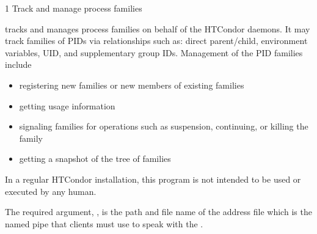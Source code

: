 \begin{ManPage}{\label{man-condor-procd}}{1}
{Track and manage process families}
\Synopsis {}



\Description 

 tracks and manages process families on behalf of the
HTCondor daemons. 
It may track families of PIDs via relationships such
as: direct parent/child, environment variables, UID, and supplementary
group IDs.  
Management of the PID families include 
\begin{itemize}
\item registering new families or new members of existing families
\item getting usage information
\item signaling families for operations such as suspension, 
continuing, or killing the family 
\item getting a snapshot of the tree of families 
\end{itemize}
In a regular HTCondor installation, 
this program is not intended to be used or executed by any human.

The required argument, 
,
is the path and file name of the address file which is the named pipe
that clients must use to speak with the .
	
\begin{Options}

	

	
	


\end{Options}
\end{ManPage}

